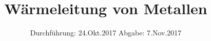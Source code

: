 

\subject{204}
\title{Wärmeleitung von Metallen}
\date{%
  Durchführung: 24.Okt.2017
  \hspace{3em}
  Abgabe: 7.Nov.2017
}



\maketitle
\thispagestyle{empty}
\tableofcontents
\newpage






\printbibliography{}



